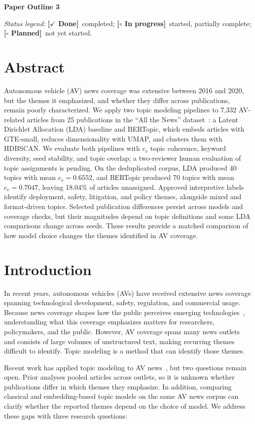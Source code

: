 \documentclass[conference]{IEEEtran}
\newcommand{\done}{\textcolor{green!40!black}{\textbf{[$\checkmark$ Done]}}}
\newcommand{\wip}{\textcolor{orange!70!black}{\textbf{[$\circ$ In progress]}}}
\newcommand{\planned}{\textcolor{blue!60!black}{\textbf{[$\square$ Planned]}}}
\begin{document}
\begin{center}\large\textbf{Paper Outline 3}\end{center}
\noindent\emph{Status legend:} \done~completed;
\wip~started, partially complete; \planned~not yet started.

\section*{Abstract}
Autonomous vehicle (AV) news coverage was extensive between 2016 and 2020, but the themes it emphasized, and whether they differ across publications, remain poorly characterized. We apply two topic modeling pipelines to 7,332 AV-related articles from 25 publications in the ``All the News'' dataset~\cite{mckinley2021}: a Latent Dirichlet Allocation (LDA) baseline and BERTopic, which embeds articles with GTE-small, reduces dimensionality with UMAP, and clusters them with HDBSCAN. We evaluate both pipelines with $c_v$ topic coherence, keyword diversity, seed stability, and topic overlap; a two-reviewer human evaluation of topic assignments is pending. On the deduplicated corpus, LDA produced 40 topics with mean $c_v=0.6552$, and BERTopic produced 70 topics with mean $c_v=0.7047$, leaving 18.04\% of articles unassigned. Approved interpretive labels identify deployment, safety, litigation, and policy themes, alongside mixed and format-driven topics. Selected publication differences persist across models and coverage checks, but their magnitudes depend on topic definitions and some LDA comparisons change across seeds. These results provide a matched comparison of how model choice changes the themes identified in AV coverage.

\section*{Introduction}
In recent years, autonomous vehicles (AVs) have received extensive news coverage spanning technological development, safety, regulation, and commercial usage. Because news coverage shapes how the public perceives emerging technologies~\cite{christen2007media, anania2018effects}, understanding what this coverage emphasizes matters for researchers, policymakers, and the public. However, AV coverage spans many news outlets and consists of large volumes of unstructured text, making recurring themes difficult to identify. Topic modeling is a method that can identify those themes. 

Recent work has applied topic modeling to AV news~\cite{kang2025unveiling}, but two questions remain open. Prior analyses pooled articles across outlets, so it
is unknown whether publications differ in which themes they emphasize. In addition, comparing classical and embedding-based topic models on the same AV news corpus can clarify whether the reported themes depend on the
choice of model. We address these gaps with three research questions:
\end{document}

